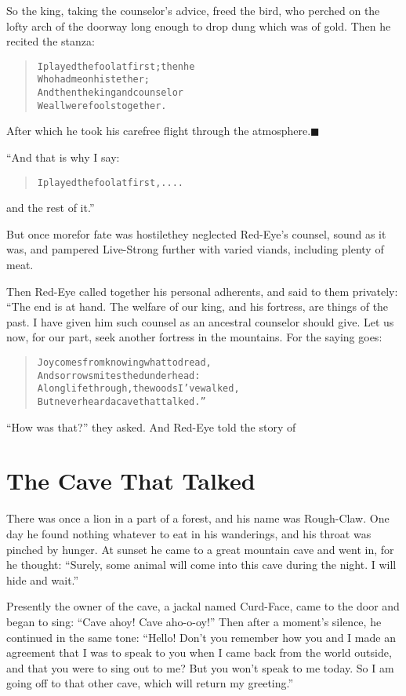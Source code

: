 \documentclass[article, twoside, 14pt]{memoir}
\newcommand{\qed}{\hfill \ensuremath{\blacksquare}}
\renewenvironment{verbatim}{%
\begin{quote}%
\vskip -10pt%
\begin{alltt}\normalfont\large}{\end{alltt}%
\end{quote}%
\vskip -10pt
} %
\begin{document}
So the king, taking the counselor's advice, freed the bird, who
perched on the lofty arch of the doorway long enough to drop dung
which was of gold. Then he recited the stanza:

\begin{verbatim}
I played the fool at first; then he
    Who had me on his tether;
And then the king and counselor{\textemdash}
    We all were fools together.
\end{verbatim}
After which he took his carefree flight through the
atmosphere.\hyperref[s61]{\qed}

“And that is why I say:

\begin{verbatim}
I played the fool at first, ....
\end{verbatim}
and the rest of it.”

But once more{\textemdash}for fate was hostile{\textemdash}they neglected Red-Eye's
counsel, sound as it was, and pampered Live-Strong further with
varied viands, including plenty of meat.

Then Red-Eye called together his personal adherents, and said to
them privately: “The end is at hand. The welfare of our king, and
his fortress, are things of the past. I have given him such counsel
as an ancestral counselor should give. Let us now, for our part,
seek another fortress in the mountains. For the saying goes:

\begin{verbatim}
Joy comes from knowing what to dread,
And sorrow smites the dunderhead:
A long life through, the woods I've walked,
But never heard a cave that talked.”
\end{verbatim}
``How was that?'' they asked. And Red-Eye told the story of

\chapter{The Cave That Talked}

\label{s62}

There was once a lion in a part of a forest, and his name was
Rough-Claw. One day he found nothing whatever to eat in his
wanderings, and his throat was pinched by hunger. At sunset he came
to a great mountain cave and went in, for he thought:
``Surely, some animal will come into this cave during the night. I will hide and wait.''

Presently the owner of the cave, a jackal named Curd-Face, came to
the door and began to sing: ``Cave ahoy! Cave aho-o-oy!'' Then
after a moment's silence, he continued in the same tone:
``Hello! Don't you remember how you and I made an agreement that I was to speak to you when I came back from the world outside, and that you were to sing out to me? But you won't speak to me today. So I am going off to that other cave, which will return my greeting.''
\end{document}
